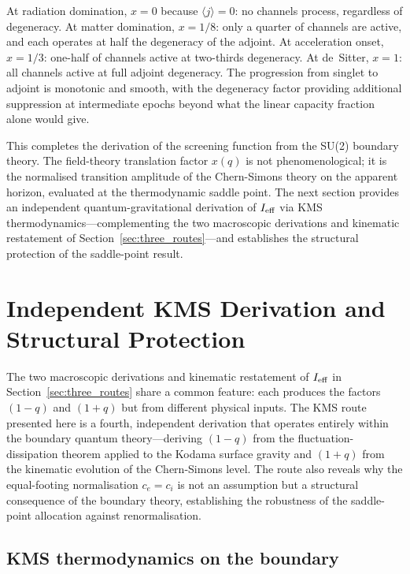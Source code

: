 \documentclass[aps,prd,twocolumn,10pt,superscriptaddress,nofootinbib]{revtex4-2}
\begin{document}
\noindent At radiation domination, $x = 0$ because
$\langle j \rangle = 0$: no channels process, regardless of
degeneracy.  At matter domination, $x = 1/8$: only a quarter of
channels are active, and each operates at half the degeneracy
of the adjoint.  At acceleration onset, $x = 1/3$: one-half
of channels active at two-thirds degeneracy.  At de~Sitter,
$x = 1$: all channels active at full adjoint degeneracy.  The
progression from singlet to adjoint is monotonic and smooth,
with the degeneracy factor providing additional suppression at
intermediate epochs beyond what the linear capacity fraction alone
would give.

This completes the derivation of the screening function from
the SU(2) boundary theory.  The field-theory translation factor
$x(q)$ is not phenomenological; it is the normalised transition
amplitude of the Chern-Simons theory on the apparent horizon,
evaluated at the thermodynamic saddle point.  The next section
provides an independent quantum-gravitational derivation of
$I_{\rm eff}$ via KMS thermodynamics---complementing the two
macroscopic derivations and kinematic restatement of
Section~\ref{sec:three_routes}---and establishes the structural
protection of the saddle-point result.


\section{Independent KMS Derivation and Structural Protection}
\label{sec:kms}

The two macroscopic derivations and kinematic restatement of $I_{\rm eff}$ in
Section~\ref{sec:three_routes} share a common feature: each
produces the factors $(1-q)$ and $(1+q)$ but from different
physical inputs.  The KMS route presented here is a fourth,
independent derivation that operates entirely within the boundary
quantum theory---deriving $(1-q)$ from the fluctuation-dissipation
theorem applied to the Kodama surface gravity and $(1+q)$ from the
kinematic evolution of the Chern-Simons level.  The route also
reveals why the equal-footing normalisation $c_e = c_i$ is not
an assumption but a structural consequence of the boundary theory,
establishing the robustness of the saddle-point allocation against
renormalisation.


\subsection{KMS thermodynamics on the boundary}
\label{sec:kms_derivation}
\end{document}
